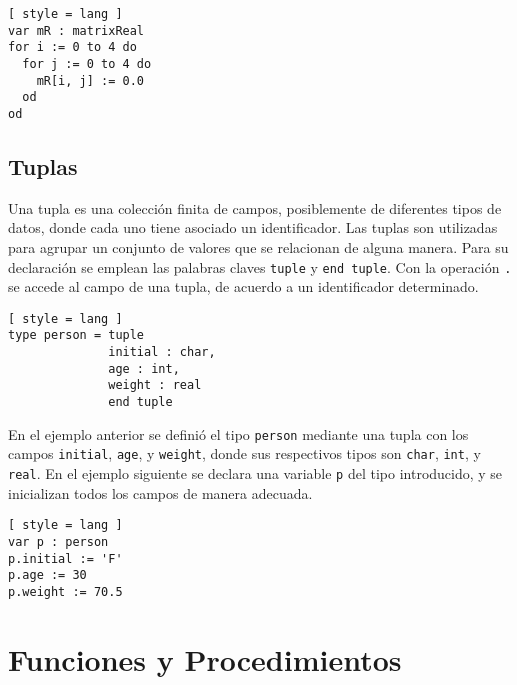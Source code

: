 \begin{lstlisting}[ style = lang ]
var mR : matrixReal
for i := 0 to 4 do
  for j := 0 to 4 do
    mR[i, j] := 0.0
  od
od
\end{lstlisting}

\subsection{Tuplas}

Una tupla es una colección finita de campos, posiblemente de diferentes tipos de datos, donde cada uno tiene asociado un identificador.
Las tuplas son utilizadas para agrupar un conjunto de valores que se relacionan de alguna manera.
Para su declaración se emplean las palabras claves \lstinline[style = lang]{tuple} y \lstinline[style = lang]{end tuple}.
Con la operación \lstinline[style = lang]{.} se accede al campo de una tupla, de acuerdo a un identificador determinado.

\begin{lstlisting}[ style = lang ]
type person = tuple
              initial : char,
              age : int,
              weight : real
              end tuple
\end{lstlisting}

En el ejemplo anterior se definió el tipo \lstinline[style = lang]{person} mediante una tupla con los campos \lstinline[style = lang]{initial}, \lstinline[style = lang]{age}, y \lstinline[style = lang]{weight}, donde sus respectivos tipos son \lstinline[style = lang]{char}, \lstinline[style = lang]{int}, y \lstinline[style = lang]{real}.
En el ejemplo siguiente se declara una variable \lstinline[style = lang]{p} del tipo introducido, y se inicializan todos los campos de manera adecuada.

\begin{lstlisting}[ style = lang ]
var p : person
p.initial := 'F'
p.age := 30
p.weight := 70.5
\end{lstlisting}



\section{Funciones y Procedimientos}

